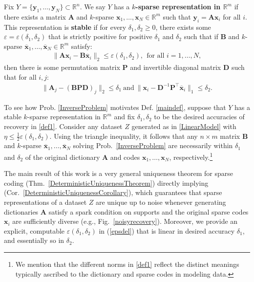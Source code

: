 \begin{definition}\label{maindef}
Fix $Y = \{ \mathbf{y}_1, \ldots, \mathbf{y}_N\} \subset \mathbb{R}^n$. We say $Y$ has a \textbf{$k$-sparse representation in $\mathbb{R}^m$} if there exists a matrix $\mathbf{A}$ and $k$-sparse $\mathbf{x}_1, \ldots, \mathbf{x}_N \in \mathbb{R}^m$ such that $\mathbf{y}_i = \mathbf{A}\mathbf{x}_i$ for all $i$. 
This representation is \textbf{stable} if for every $\delta_1, \delta_2 \geq 0$, there exists some $\varepsilon = \varepsilon(\delta_1, \delta_2)$ that is strictly positive for positive $\delta_1$ and $\delta_2$ such that if $\mathbf{B}$ and $k$-sparse $\mathbf{\overline x}_1, \ldots, \mathbf{\overline x}_N \in \mathbb{R}^m$ satisfy:
\begin{align*}
	\|\mathbf{A}\mathbf{x}_i - \mathbf{B}\mathbf{\overline x}_i\|_2 \leq \varepsilon(\delta_1, \delta_2),\ \   \text{for all $i=1,\ldots,N$},
\end{align*}
then there is some permutation matrix $\mathbf{P}$ and invertible diagonal matrix $\mathbf{D}$ such that for all $i, j$:
\begin{align}\label{def1}
\|\mathbf{A}_j - (\mathbf{BPD})_j\|_2 \leq \delta_1 \ \text{and} \ \|\mathbf{x}_i - \mathbf{D}^{-1}\mathbf{P}^{\top}\mathbf{\overline x}_i\|_1 \leq \delta_2.
\end{align}
\end{definition}

To see how Prob. \ref{InverseProblem} motivates Def. \ref{maindef}, suppose that $Y$ has a stable $k$-sparse representation in $\mathbb{R}^m$ and fix $\delta_1, \delta_2$ to be the desired accuracies of recovery in \eqref{def1}. Consider any dataset $Z$ generated as in \eqref{LinearModel} with $\eta \leq \frac{1}{2} \varepsilon(\delta_1, \delta_2)$. Using the triangle inequality, it follows that any $n \times m$ matrix $\mathbf{B}$ and $k$-sparse $\mathbf{\overline x}_1, \ldots, \mathbf{\overline x}_N$ solving Prob.~\ref{InverseProblem} are necessarily within $\delta_1$ and $\delta_2$ of the original dictionary $\mathbf{A}$ and codes $\mathbf{x}_1, \ldots, \mathbf{x}_N$, respectively.\footnote{We mention that the different norms in \eqref{def1} reflect the distinct meanings typically ascribed to the dictionary and sparse codes in modeling data.}

The main result of this work is a very general uniqueness theorem for sparse coding (Thm.~\ref{DeterministicUniquenessTheorem}) directly 
implying (Cor.~\ref{DeterministicUniquenessCorollary}), which guarantees that sparse representations of a dataset $Z$ are unique up to noise whenever generating dictionaries $\mathbf{A}$ satisfy a spark condition on supports and the original sparse codes $\mathbf{x}_i$ are sufficiently diverse (e.g., Fig.~\ref{noisyrecovery}).  Moreover, we provide an explicit, computable $\varepsilon(\delta_1, \delta_2)$ in (\ref{epsdel}) that is linear in desired accuracy $\delta_1$, and essentially so in $\delta_2$.

